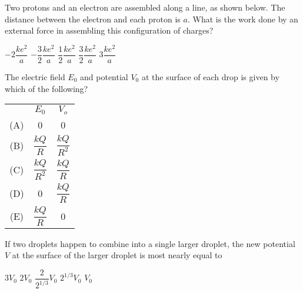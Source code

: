 \documentclass[12pt]{../oss-classkick-exam}
\begin{document}
\begin{questions}

  \question Two protons and an electron are assembled along a line, as shown
  below. The distance between the electron and each proton is $a$. What is the
  work done by an external force in assembling this configuration of charges?
  \begin{choices}
    \choice $-2\dfrac{ke^2}a$
    \choice $-\dfrac32\dfrac{ke^2}a$
    \choice $\dfrac12\dfrac{ke^2}a$
    \choice $\dfrac32\dfrac{ke^2}a$
    \choice $3\dfrac{ke^2}a$
  \end{choices}


  \question The electric field $E_0$ and potential $V_0$ at the surface of each
  drop is given by which of the following?
  \label{rain1}
  
  \begin{tabular}{ccc}
    & \underline{$E_0$} & \underline{$V_o$} \\
    (A) & 0 & 0 \\
    (B) & $\dfrac{kQ}R$ & $\dfrac{kQ}{R^2}$ \\
    (C) & $\dfrac{kQ}{R^2}$ & $\dfrac{kQ}R$ \\
    (D) & 0 & $\dfrac{kQ}R$ \\
    (E) & $\dfrac{kQ}R$ & 0
  \end{tabular}

  \question If two droplets happen to combine into a single larger droplet, the
  new potential $V$ at the surface of the larger droplet is most nearly equal to
  \label{rain2}
  \begin{choices}
    \choice $3V_0$
    \choice $2V_0$
    \choice $\dfrac2{2^{1/3}}V_0$
    \choice $2^{1/3}V_0$
    \choice $V_0$
  \end{choices}


\end{questions}
\end{document}

